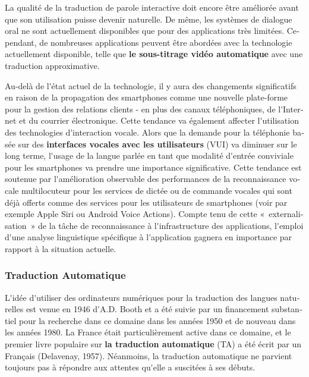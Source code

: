 \documentclass[]{../metanetpaper}
\begin{document}
\begin{french}
\begin{multicols}{2}
La qualité de la traduction de parole interactive doit encore être
améliorée avant que son utilisation puisse devenir naturelle. De même,
les systèmes de dialogue oral ne sont actuellement disponibles que
pour des applications très limitées. Cependant, de nombreuses
applications peuvent être abordées avec la technologie actuellement
disponible, telle que {\bf le sous-titrage vidéo automatique} avec une
traduction approximative.

Au-delà de l{\mbox '}état actuel de la technologie, il y aura des
changements significatifs en raison de la propagation des smartphones
comme une nouvelle plate-forme pour la gestion des relations clients -
en plus des canaux téléphoniques, de l{\mbox '}Internet et du courrier
électronique. Cette tendance va également affecter l{\mbox
  '}utilisation des technologies d{\mbox '}interaction vocale. Alors
que la demande pour la téléphonie basée sur des {\bf interfaces
  vocales avec les utilisateurs} (VUI) va diminuer sur le long terme,
l{\mbox '}usage de la langue parlée en tant que modalité d{\mbox
  '}entrée conviviale pour les smartphones va prendre une importance
significative. Cette tendance est soutenue par l{\mbox '}amélioration
observable des performances de la reconnaissance vocale multilocuteur
pour les services de dictée ou de commande vocales qui sont déjà
offerts comme des services pour les utilisateurs de smartphones (voir
par exemple Apple Siri ou Android Voice Actions). Compte tenu de cette
«~externalisation~» de la tâche de reconnaissance à l{\mbox
  '}infrastructure des applications, l{\mbox '}emploi d{\mbox '}une
analyse linguistique spécifique à l{\mbox '}application gagnera en
importance par rapport à la situation actuelle.

\subsubsection{Traduction Automatique}
L{\mbox '}idée d{\mbox '}utiliser des ordinateurs numériques pour la traduction des
langues naturelles est venue en 1946 d{\mbox '}A.D. Booth et a été suivie par
un financement substantiel pour la recherche dans ce domaine dans les
années 1950 et de nouveau dans les années 1980. La France était
particulièrement active dans ce domaine, et le premier livre populaire
sur {\bf la traduction automatique} (TA) a été écrit par un Français
(Delavenay, 1957). Néanmoins, la traduction automatique ne
parvient toujours pas à répondre aux attentes qu{\mbox '}elle a suscitées à
ses débuts.


\end{multicols}
\end{french}
\end{document}
